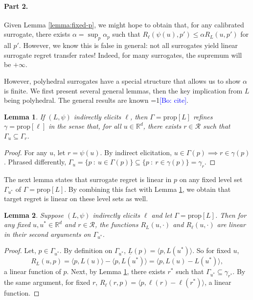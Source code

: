 \documentclass{article}
\newtheorem{lemma}{Lemma}
\newcommand{\Comments}{1}
\newcommand{\mynote}[2]{\ifnum\Comments=1\textcolor{#1}{#2}\fi}
\newcommand{\bo}[1]{\mynote{blue}{[Bo: #1]}}
\newcommand{\reals}{\mathbb{R}}
\newcommand{\prop}[1]{\mathrm{prop}[#1]}
\newcommand{\R}{\mathcal{R}}
\newcommand{\risk}[1]{\underline{#1}}
\newcommand{\inprod}[2]{\langle #1, #2 \rangle}%
\begin{document}
\paragraph{Part 2.}
Given Lemma \ref{lemma:fixed-p}, we might hope to obtain that, for any calibrated surrogate, there exists $\alpha = \sup_p \alpha_p$ such that $R_{\ell}(\psi(u),p') \leq \alpha R_L(u,p')$ for all $p'$.
However, we know this is false in general: not all surrogates yield linear surrogate regret transfer rates!
Indeed, for many surrogates, the supremum will be $+\infty$.

However, polyhedral surrogates have a special structure that allows us to show $\alpha$ is finite.
We first present several general lemmas, then the key implication from $L$ being polyhedral.
The general results are known \bo{cite}.
\begin{lemma} \label{lemma:refines}
  If $(L,\psi)$ indirectly elicits $\ell$, then $\Gamma = \prop{L}$ \emph{refines} $\gamma = \prop{\ell}$ in the sense that, for all $u \in \reals^d$, there exists $r \in \R$ such that $\Gamma_u \subseteq \Gamma_r$.
\end{lemma}
\begin{proof}
  For any $u$, let $r = \psi(u)$.
  By indirect elicitation, $u \in \Gamma(p) \implies r \in \gamma(p)$.
  Phrased differently, $\Gamma_u = \{p ~:~ u \in \Gamma(p)\} \subseteq \{p ~:~ r \in \gamma(p)\} = \gamma_r$.
\end{proof}
The next lemma states that surrogate regret is linear in $p$ on any fixed level set $\Gamma_{u^*}$ of $\Gamma = \prop{L}$.
By combining this fact with Lemma \ref{lemma:refines}, we obtain that target regret is linear on these level sets as well.
\begin{lemma} \label{lemma:linear-on-levelset}
  Suppose $(L,\psi)$ indirectly elicits $\ell$ and let $\Gamma = \prop{L}$.
  Then for any fixed $u,u^* \in \reals^d$ and $r \in \R$, the functions $R_L(u,\cdot)$ and $R_{\ell}(u,\cdot)$ are linear in their second arguments on $\Gamma_{u^*}$.
\end{lemma}
\begin{proof}
  Let, $p \in \Gamma_{u^*}$.
  By definition on $\Gamma_{u^*}$, $\risk{L}(p) = \inprod{p}{L(u^*)}$.
  So for fixed $u$,
    \[ R_L(u,p) = \inprod{p}{L(u)} - \inprod{p}{L(u^*)} = \inprod{p}{L(u) - L(u^*)} , \]
  a linear function of $p$.
  Next, by Lemma \ref{lemma:refines}, there exists $r^*$ such that $\Gamma_{u^*} \subseteq \gamma_{r^*}$.
  By the same argument, for fixed $r$, $R_{\ell}(r,p) = \inprod{p}{\ell(r) - \ell(r^*)}$, a linear function.
\end{proof}
\end{document}
